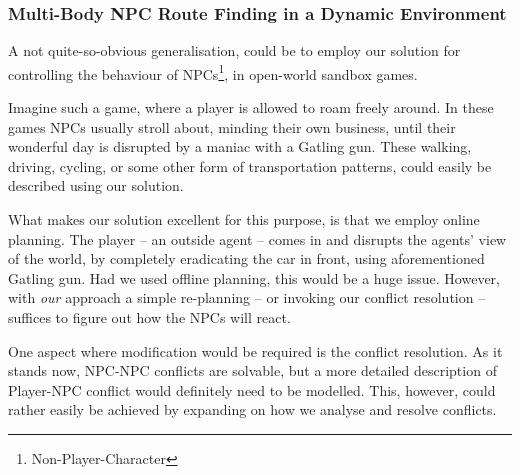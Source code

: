 \documentclass[letterpaper]{article}
\begin{document}
		\subsubsection{Multi-Body NPC Route Finding in a Dynamic Environment}
			A not quite-so-obvious generalisation, could be to employ our solution for controlling the behaviour of NPCs\footnote{Non-Player-Character}, in open-world sandbox games.

			Imagine such a game, where a player is allowed to roam freely around. In these games NPCs usually stroll about, minding their own business, until their wonderful day is disrupted by a maniac with a Gatling gun. These walking, driving, cycling, or some other form of transportation patterns, could easily be described using our solution. 

			What makes our solution excellent for this purpose, is that we employ online planning. The player -- an outside agent -- comes in and disrupts the agents' view of the world, by completely eradicating the car in front, using aforementioned Gatling gun. Had we used offline planning, this would be a huge issue. However, with \emph{our} approach a simple re-planning -- or invoking our conflict resolution -- suffices to figure out how the NPCs will react.

			One aspect where modification would be required is the conflict resolution. As it stands now, NPC-NPC conflicts are solvable, but a more detailed description of Player-NPC conflict would definitely need to be modelled. This, however, could rather easily be achieved by expanding on how we analyse and resolve conflicts.




\end{document}
